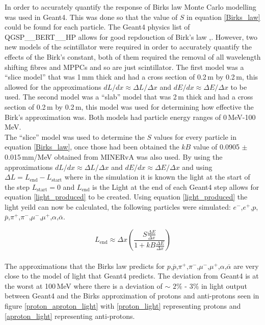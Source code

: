\documentclass[12pt,a4paper]{article}
\begin{document}
In order to accurately quantify the response of Birks law Monte Carlo modelling was used in Geant4. This was done so that the value of $S$ in equation \ref{Birks_law} could be found for each particle. The Geant4 physics list of QGSP\_\_BERT\_\_HP allows for good repdouction of Birk's law \cite{Minerva_QGSP},\cite{minerva_birks}. However, two new models of the scintillator were required in order to accurately quantify the effects of the Birk's constant, both of them required the removal of all wavelength shifting fibres and MPPCs and so are just scintillator. The first model was a ``slice model'' that was 1\,mm thick and had a cross section of 0.2\,m by 0.2\,m, this allowed for the approximations $dL/dx \approx \Delta L / \Delta x$ and $dE/dx \approx \Delta E / \Delta x$ to be used. The second model was a ``slab'' model that was 2\,m thick and had a cross section of 0.2\,m by 0.2\,m, this model was used for determining how effective the Birk's approximation was. Both models had particle energy ranges of 0\,MeV-100\,MeV.\\

The ``slice'' model was used to determine the $S$ values for every particle in equation \ref{Birks_law}, once those had been obtained the $kB$ value of 0.0905 $\pm$ 0.015\,mm/MeV obtained from MINERvA was also used. By using the approximations $dL/dx \approx \Delta L / \Delta x$ and $dE/dx \approx \Delta E / \Delta x$ and using $\Delta L = L_{\textrm{end}} - L_{\textrm{start}} $ where in the simulation it is known the light at the start of the step $L_{\textrm{start}} = 0$ and $L_{\textrm{end}}$ is the Light at the end of each Geant4 step allows for equation \ref{light_produced} to be created. Using equation \ref{light_produced} the light yeild can now be calculated, the following particles were simulated: $e^-$,$e^+$,$p$,$\overline{p}$,$\pi^+$,$\pi^-$,$\mu^-$,$\mu^+$,$\alpha$,$\overline{\alpha}$. 

\begin{equation}
L_{\textrm{end}}\approx \Delta x \left(\frac{S\frac{\Delta E}{\Delta x}}{1 + kB \frac{\Delta E}{\Delta x}}\right) 
\label{light_produced}
\end{equation}\\

The approximations that the Birks law predicts for $p$,$\overline{p}$,$\pi^+$,$\pi^-$,$\mu^-$,$\mu^+$,$\alpha$,$\overline{\alpha}$ are very close to the model of light that Geant4 predicts. The deviation from Geant4 is at the worst at 100\,MeV where there is a deviation of $\sim$ $2\%$ - $3\%$ in light output between Geant4 and the Birks approximation of protons and anti-protons seen in figure \ref{proton_aproton_light} with \ref{proton_light} representing protons and \ref{aproton_light} representing anti-protons. 
\end{document}
